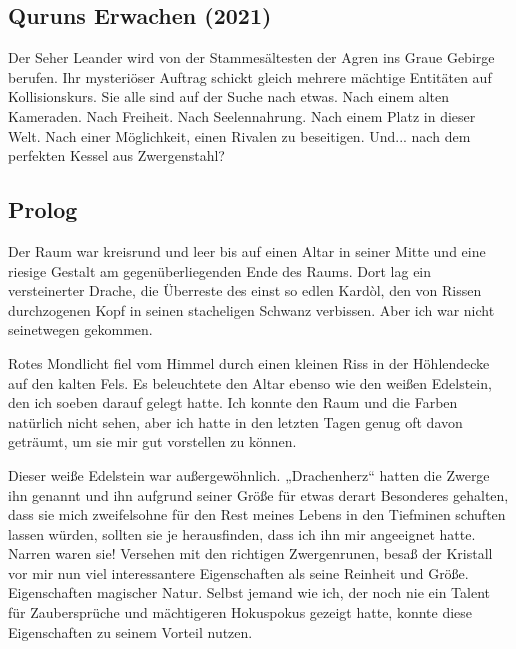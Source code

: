 \begin{chapterbox}
    \chapter{Quruns Erwachen (2021)}
    \label{2021-quruns-erwachen}
    
    Der Seher Leander wird von der Stammesältesten der Agren ins Graue Gebirge berufen. Ihr mysteriöser Auftrag schickt gleich mehrere mächtige Entitäten auf Kollisionskurs. Sie alle sind auf der Suche nach etwas. Nach einem alten Kameraden. Nach Freiheit. Nach Seelennahrung. Nach einem Platz in dieser Welt. Nach einer Möglichkeit, einen Rivalen zu beseitigen. Und... nach dem perfekten Kessel aus Zwergenstahl?

\end{chapterbox}




\newpage
\section{Prolog}


Der Raum war kreisrund und leer bis auf einen Altar in seiner Mitte und eine riesige Gestalt am gegenüberliegenden Ende des Raums. Dort lag ein versteinerter Drache, die Überreste des einst so edlen Kardòl, den von Rissen durchzogenen Kopf in seinen stacheligen Schwanz verbissen. Aber ich war nicht seinetwegen gekommen.

Rotes Mondlicht fiel vom Himmel durch einen kleinen Riss in der Höhlendecke auf den kalten Fels. Es beleuchtete den Altar ebenso wie den weißen Edelstein, den ich soeben darauf gelegt hatte. Ich konnte den Raum und die Farben natürlich nicht sehen, aber ich hatte in den letzten Tagen genug oft davon geträumt, um sie mir gut vorstellen zu können.

Dieser weiße Edelstein war außergewöhnlich. „Drachenherz“ hatten die Zwerge ihn genannt und ihn aufgrund seiner Größe für etwas derart Besonderes gehalten, dass sie mich zweifelsohne für den Rest meines Lebens in den Tiefminen schuften lassen würden, sollten sie je herausfinden, dass ich ihn mir angeeignet hatte. Narren waren sie! Versehen mit den richtigen Zwergenrunen, besaß der Kristall vor mir nun viel interessantere Eigenschaften als seine Reinheit und Größe. Eigenschaften magischer Natur. Selbst jemand wie ich, der noch nie ein Talent für Zaubersprüche und mächtigeren Hokuspokus gezeigt hatte, konnte diese Eigenschaften zu seinem Vorteil nutzen.

